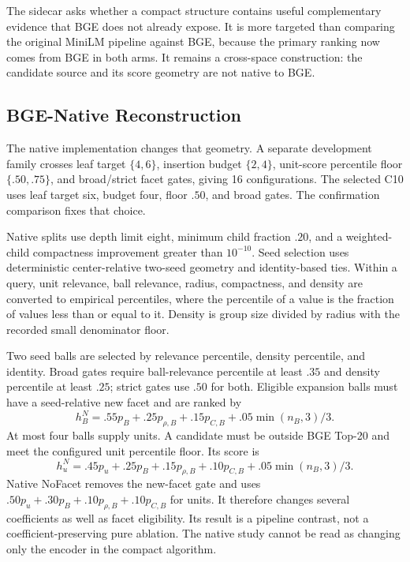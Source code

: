 \documentclass[11pt,a4paper]{article}
\begin{document}
The sidecar asks whether a compact structure contains useful complementary
evidence that BGE does not already expose. It is more targeted than comparing
the original MiniLM pipeline against BGE, because the primary ranking now
comes from BGE in both arms. It remains a cross-space construction: the
candidate source and its score geometry are not native to BGE.

\subsection{BGE-Native Reconstruction}
The native implementation changes that geometry. A separate development
family crosses leaf target $\{4,6\}$, insertion budget $\{2,4\}$,
unit-score percentile floor $\{.50,.75\}$, and broad/strict facet gates,
giving 16 configurations. The selected C10 uses leaf target six, budget four,
floor $.50$, and broad gates. The confirmation comparison fixes that choice.

Native splits use depth limit eight, minimum child fraction $.20$, and a
weighted-child compactness improvement greater than $10^{-10}$. Seed
selection uses deterministic center-relative two-seed geometry and identity-based ties.
Within a query, unit relevance, ball relevance, radius, compactness, and
density are converted to empirical percentiles, where the percentile of a
value is the fraction of values less than or equal to it. Density is group
size divided by radius with the recorded small denominator floor.

Two seed balls are selected by relevance percentile, density percentile, and
identity. Broad gates require ball-relevance percentile at least $.35$ and
density percentile at least $.25$; strict gates use $.50$ for both.
Eligible expansion balls must have a seed-relative new facet and are ranked by
\begin{equation}
h_B^{N}=.55p_B+.25p_{\rho,B}+.15p_{C,B}
        +.05\min(n_B,3)/3.
\end{equation}
At most four balls supply units. A candidate must be outside BGE Top-20 and
meet the configured unit percentile floor. Its score is
\begin{equation}
h_u^{N}=.45p_u+.25p_B+.15p_{\rho,B}+.10p_{C,B}
        +.05\min(n_B,3)/3.
\end{equation}
Native NoFacet removes the new-facet gate and uses
$.50p_u+.30p_B+.10p_{\rho,B}+.10p_{C,B}$ for units.
It therefore changes several coefficients as well as facet eligibility.
Its result is a pipeline contrast, not a coefficient-preserving pure ablation.
The native study cannot be read as changing only the encoder in the compact
algorithm.
\end{document}
